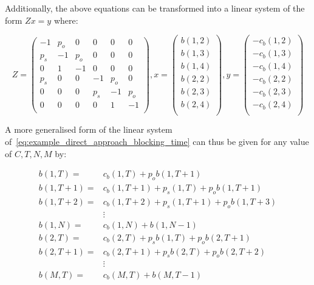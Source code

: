 Additionally, the above equations can be transformed into a linear system of the
form \(Zx=y\) where:

\begin{equation}\label{eq:example_direct_approach_blocking_time}
    Z=
    \begin{pmatrix}
         -1 & p_o &   0 &   0 &   0 &   0 \\ %
        p_s &  -1 & p_o &   0 &   0 &   0 \\ %
          0 &   1 & - 1 &   0 &   0 &   0 \\ %
        p_s &   0 &   0 &  -1 & p_o &   0 \\ %
          0 &   0 &   0 & p_s &  -1 & p_o \\ %
          0 &   0 &   0 &   0 &   1 &  -1 \\ %
    \end{pmatrix},
    x=
    \begin{pmatrix}
        b(1,2) \\
        b(1,3) \\
        b(1,4) \\
        b(2,2) \\
        b(2,3) \\
        b(2,4) \\
    \end{pmatrix},
    y=
    \begin{pmatrix}
        -c_b(1,2) \\
        -c_b(1,3) \\
        -c_b(1,4) \\
        -c_b(2,2) \\
        -c_b(2,3) \\
        -c_b(2,4) \\
    \end{pmatrix}
\end{equation}

A more generalised form of the linear system
of~\eqref{eq:example_direct_approach_blocking_time} can thus be given for any
value of \(C,T,N,M\) by:

\begin{align}
    b(1,T) =& c_b(1, T) + p_o b(1, T + 1)
    \label{eq:first_eq_of_blocking_general}\\
    b(1,T + 1) =& c_b(1, T + 1) + p_s(1, T) + p_o b(1, T + 1) \\
    b(1,T + 2) =& c_b(1, T + 2) + p_s(1, T + 1) + p_o b(1, T + 3) \\
    & \vdots \\
    b(1, N) =& c_b(1, N) + b(1, N - 1) \\
    b(2, T) =& c_b(2, T) + p_s b(1, T) + p_o b(2, T + 1) \\
    b(2, T + 1) =& c_b(2, T + 1) + p_s b(2, T) + p_o b(2, T + 2) \\
    & \vdots \\
    b(M, T) =& c_b(M, T) + b(M, T-1) \label{eq:last_eq_of_blocking_general}
\end{align}

